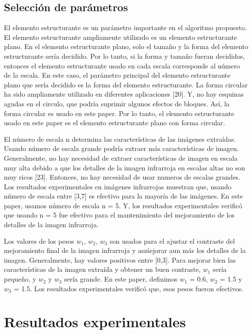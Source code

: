 \documentclass[a4paper, 11 pt, conference]{ieeeconf}      %
\begin{document}
\subsection{Selecci\'on de par\'ametros}

El elemento estructurante es un par\'ametro importante en el algoritmo propuesto.
El elemento estructurante ampliamente utilizado es un elemento estructurante plano. En el elemento estructurante plano, solo el tamaño y la forma del elemento estructurante ser\'ia decidido. Por lo tanto, si la forma y tamaño fueran decididos, entonces el elemento estructurante usado en cada escala corresponde al n\'umero de la escala.  En este caso, el par\'ametro principal del elemento estructurante plano que ser\'ia decidido es la forma del elemento estructurante. La forma circular ha sido ampliamente utilizado en diferentes aplicaciones [20]. Y, no hay esquinas agudas en el circulo, que podr\'ia suprimir algunos efectos de bloques. As\'i, la forma circular es usado en este paper. Por lo tanto, el elemento estructurante usado en este paper es el elemento estructurante plano con forma circular.

El n\'umero de escala n determina las caracter\'isticas de las im\'agenes extra\'idas. Usando n\'umero de escala grande podr\'ia extraer m\'as caracter\'isticas de imagen. Generalmente, no hay necesidad de extraer caracter\'isticas de imagen en escala muy alta debido a que los detalles de la imagen infrarroja en escalas altas no son muy ricos [23]. Entonces, no hay necesidad de usar numeros de escalas grandes. Los resultados experimentales en im\'agenes infrarrojas muestran que, usando n\'umero de escala entre [3,7] es efectivo para la mayor\'ia de las im\'agenes. En este paper, usamos n\'umero de escala n = 5. Y, los resultados experimentales verific\'o que usando n = 5 fue efectivo para el mantenimiento del mejoramiento de los detalles de la imagen infrarroja.

Los valores de los pesos $w_1$, $w_2$, $w_3$ son usados para el ajustar el contraste del mejoramiento final de la imagen infrarroja y as\' mejorar aun m\'as los detalles de la imagen. Generalmente, hay valores positivos entre [0,3]. Para mejorar bien las caracter\'isticas de la imagen extra\'ida y obtener un buen contraste, $w_1$ ser\'ia pequeño, y $w_2$ y $w_3$ ser\'ia grande. En este paper, definimos $w_1$ = 0.6, $w_2$ = 1.5 y $w_3$ = 1.5. Los resultados experimentales verific\'o que, esos pesos fueron efectivos.

\section{Resultados experimentales}
\end{document}

